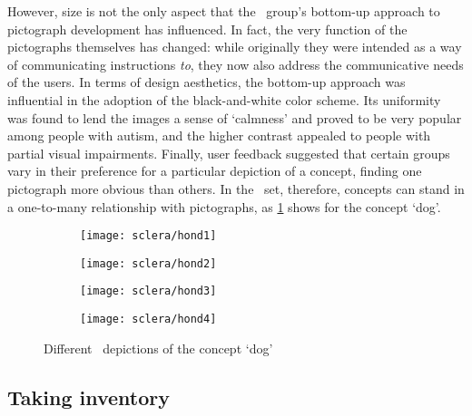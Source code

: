 However, size is not the only aspect that the \sclera\ group's bottom-up
approach to pictograph development has influenced. In fact, the very function
of the pictographs themselves has changed: while originally they were intended
as a way of communicating instructions \emph{to}, they now also address the
communicative needs of the users. In terms of design aesthetics, the bottom-up
approach was influential in the adoption of the black-and-white color scheme.
Its uniformity was found to lend the images a sense of `calmness' and proved to
be very popular among people with autism, and the higher contrast appealed to
people with partial visual impairments. Finally, user feedback suggested that
certain groups vary in their preference for a particular depiction of a
concept, finding one pictograph more obvious than others. In the \sclera\ set,
therefore, concepts can stand in a one-to-many relationship with pictographs,
as \cref{fig:differentdogs} shows for the concept `dog'.

\begin{figure}[h]
    \centering
    \begin{subfigure}{0.22\textwidth}
        \texttt{[image: sclera/hond1]}
    \end{subfigure}
    \begin{subfigure}{0.22\textwidth}
        \texttt{[image: sclera/hond2]}
    \end{subfigure}
    \begin{subfigure}{0.22\textwidth}
        \texttt{[image: sclera/hond3]}
    \end{subfigure}
    \begin{subfigure}{0.22\textwidth}
        \texttt{[image: sclera/hond4]}
    \end{subfigure}
    \caption{Different \sclera\ depictions of the concept `dog'}
    \label{fig:differentdogs}
\end{figure}

\subsection{Taking inventory} %
\label{sub:scleraInventory}

